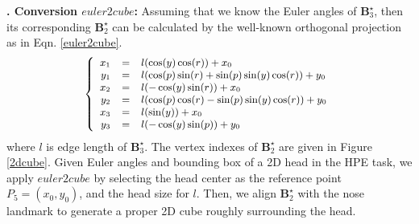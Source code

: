 \documentclass{article}
\begin{document}
{\bf {}. Conversion $euler2cube$:} Assuming that we know the Euler angles of $\mathbf{B}^\star_3$, then its corresponding $\mathbf{B}^\star_2$ can be calculated by the well-known orthogonal projection as in Eqn. \ref{euler2cube}.
\begin{equation}\small
    \begin{aligned}
    \left\{ \begin{array}{rcl}
    x_1 & = & l (\cos(y) \cos(r)) + x_0 \\ 
    y_1 & = & l (\cos(p)\sin(r) + \sin(p)\sin(y)\cos(r)) + y_0 \\ 
    x_2 & = & l (-\cos(y) \sin(r)) + x_0 \\ 
    y_2 & = & l (\cos(p)\cos(r) - \sin(p)\sin(y)\cos(r)) + y_0 \\ 
    x_3 & = & l (\sin(y)) + x_0 \\ 
    y_3 & = & l (-\cos(y)\sin(p)) + y_0 \\ 
    \end{array}\right.
    \label{euler2cube}
    \end{aligned}
\end{equation}
where $l$ is edge length of $\mathbf{B}^\star_3$. The vertex indexes of $\mathbf{B}^\star_2$ are given in Figure \ref{2dcube}. Given Euler angles and bounding box of a 2D head in the HPE task, we apply $euler2cube$ by selecting the head center as the reference point $P_5 = (x_0, y_0)$, and the head size for $l$. Then, we align $\mathbf{B}^\star_2$ with the nose landmark to generate a proper 2D cube roughly surrounding the head.
\end{document}
